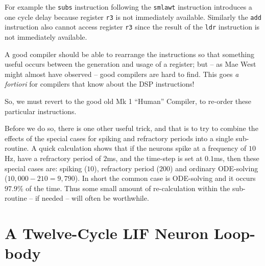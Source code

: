 For example the {\tt subs} instruction following the {\tt smlawt}
instruction introduces a one cycle delay because register {\tt r3} is
not immediately available. Similarly the {\tt add} instruction also cannot
access register {\tt r3} since the result of the {\tt ldr} instruction
is not immediately available.

A good compiler should be able to rearrange the instructions so that
something useful occurs between the generation and usage of a
register; but -- as Mae West might almost have observed -- good
compilers are hard to find. This goes {\it a fortiori} for compilers
that know about the DSP instructions!

So, we must revert to the good old Mk 1 ``Human'' Compiler, to
re-order these particular instructions.

Before we do so, there is one other useful trick, and that is to try
to combine the effects of the special cases for spiking and refractory
periods into a single sub-routine. A quick calculation shows that if
the neurons spike at a frequency of $10$Hz, have a refractory period
of $2$ms, and the time-step is set at $0.1$ms, then these special
cases are: spiking ($10$), refractory period ($200$) and ordinary
ODE-solving ($10,000-210=9,790$). In short the common case is
ODE-solving and it occurs $97.9${\%} of the time. Thus some small
amount of re-calculation within the sub-routine -- if needed -- will
often be worthwhile.

\section{A Twelve-Cycle LIF Neuron Loop-body}

